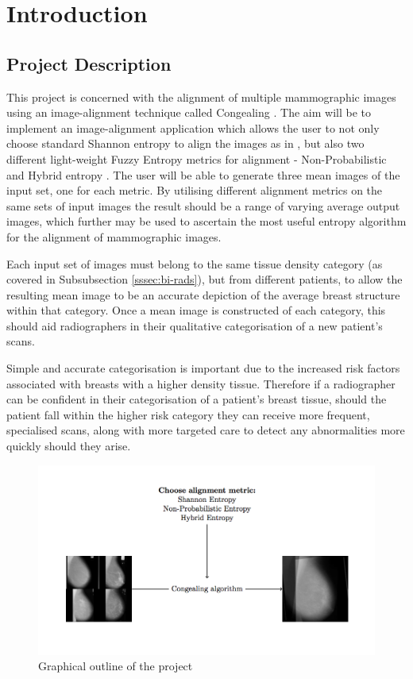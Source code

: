 \chapter{Introduction}

\section{Project Description}
This project is concerned with the alignment of multiple \gls{mammographic images} using an image-alignment technique called \Gls{Congealing} \cite{joint-alignment}. The aim will be to implement an image-alignment application which allows the user to not only choose standard Shannon entropy to align the images as in \cite{joint-alignment}, but also two different light-weight Fuzzy Entropy metrics for alignment - Non-Probabilistic \cite{DeLuca_Termini_1972} and Hybrid entropy \cite{Pal_Pal_1992}. The user will be able to generate three mean images of the input set, one for each metric. By utilising different alignment metrics on the same sets of input images the result should be a range of varying average output images, which further may be used to ascertain the most useful entropy algorithm for the alignment of \gls{mammographic images}.

Each input set of images must belong to the same tissue density category (as covered in Subsubsection \ref{sssec:bi-rads}), but from different patients, to allow the resulting mean image to be an accurate depiction of the average breast structure within that category. Once a mean image is constructed of each category, this should aid radiographers in their qualitative categorisation of a new patient's scans.

Simple and accurate categorisation is important due to the increased risk factors associated with breasts with a higher density tissue. Therefore if a radiographer can be confident in their categorisation of a patient's breast tissue, should the patient fall within the higher risk category they can receive more frequent, specialised scans, along with more targeted care to detect any abnormalities more quickly should they arise.

\begin{figure}[H]
  \center
    \includegraphics{Introduction/diagram/diagram.png}
    \caption{Graphical outline of the project}
    \label{fig:project-desc-img}
\end{figure}




